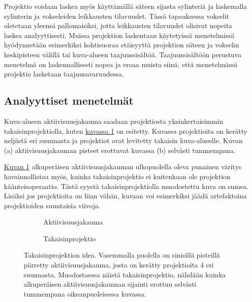 Projektio voidaan laskea myös käyttämällä säteen sijasta sylinteriä ja laskemalla sylinterin ja vokseleiden leikkausten tilavuudet. Tässä tapauksessa vokselit oletetaan yleensä pallomaisiksi, jotta leikkausten tilavuudet olisivat nopeita laskea analyyttisesti.\cite{lougovski_volume_2014} Muissa projektion laskentaan käytetyissä menetelmissä hyödynnetään esimerkiksi kohtisuoraa etäisyyttä projektion säteen ja vokselin keskipisteen välillä\cite{aguiar_geometrical_2010} tai kuva-alueen taajuussisältöä\cite{zeng_frequency_1992, zeng_rotating_1994}. Taajuussisältöön perustuva menetelmä on laskennallisesti nopea ja eroaa muista siinä, että menetelmässä projektio lasketaan taajuusavaruudessa\cite{zeng_frequency_1992, zeng_rotating_1994}.

\subsection{Analyyttiset menetelmät}
Kuva-alueen aktiivisuusjakauma saadaan projektiosta yksinkertaisimmin takaisinprojektiolla, kuten \hyperref[fig:takaisinprojektio]{kuvassa \ref*{fig:takaisinprojektio}} on esitetty. Kuvassa projektioita on kerätty neljästä eri suunnasta ja projektiot ovat levitetty takaisin kuva-alueelle. Kuvan (a) aktiivisuusjakauman pisteet erottuvat kuvassa (b) selvästi tummempana.

\hyperref[fig:takaisinprojektio]{Kuvan \ref*{fig:takaisinprojektio}} alkuperäisen aktiivisuusjakauman ulkopuolella oleva punainen väritys havainnollistaa myös, kuinka takaisinprojektio ei kuitenkaan ole projektion käänteisoperaatio. Tästä syystä takaisinprojektiolla muodostettu kuva on sumea. Lisäksi jos projektioita on liian vähän, kuvaan voi esimerkiksi jäädä artefaktoina projektioiden suuntaisia viivoja.\cite{bruyant_analytic_2002, stiller_basics_2018}

\begin{figure}[H]
    \centering
    \captionsetup{width=.9\textwidth}
    \begin{subfigure}[t]{.4\textwidth}
        \resizebox{\linewidth}{!}{}
        \caption{Aktiivisuusjakauma}
    \end{subfigure}%
    \hspace*{.1\textwidth}
    \begin{subfigure}[t]{.4\textwidth}
        \resizebox{\linewidth}{!}{}
        \caption{Takaisinprojektio}
    \end{subfigure}%
    \caption{Takaisinprojektion idea. Vasemmalla puolella on sinisillä pisteillä piirretty aktiivisuusjakauma, josta on kerätty projektioita 4 eri suunnasta. Muodostaessa näistä takaisinprojektio, nähdään kuinka alkuperäisen aktiivisuusjakauman sijainti erottuu selvästi tummempana oikeanpuoleisessa kuvassa.}
    \label{fig:takaisinprojektio}
\end{figure}

